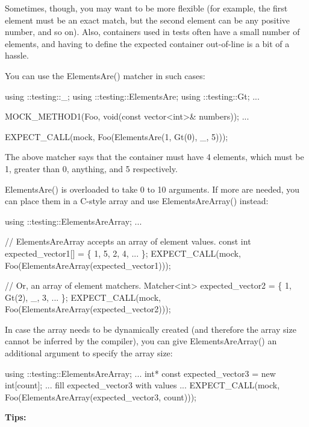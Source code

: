 Sometimes, though, you may want to be more flexible (for example, the first element must be an exact match, but the second element can be any positive number, and so on). Also, containers used in tests often have a small number of elements, and having to define the expected container out-\/of-\/line is a bit of a hassle.

You can use the {\ttfamily Elements\+Are()} matcher in such cases\+:


\begin{DoxyCode}
using ::testing::\_;
using ::testing::ElementsAre;
using ::testing::Gt;
...

  MOCK\_METHOD1(Foo, void(const vector<int>& numbers));
...

  EXPECT\_CALL(mock, Foo(ElementsAre(1, Gt(0), \_, 5)));
\end{DoxyCode}


The above matcher says that the container must have 4 elements, which must be 1, greater than 0, anything, and 5 respectively.

{\ttfamily Elements\+Are()} is overloaded to take 0 to 10 arguments. If more are needed, you can place them in a C-\/style array and use {\ttfamily Elements\+Are\+Array()} instead\+:


\begin{DoxyCode}
using ::testing::ElementsAreArray;
...

  // ElementsAreArray accepts an array of element values.
  const int expected\_vector1[] = \{ 1, 5, 2, 4, ... \};
  EXPECT\_CALL(mock, Foo(ElementsAreArray(expected\_vector1)));

  // Or, an array of element matchers.
  Matcher<int> expected\_vector2 = \{ 1, Gt(2), \_, 3, ... \};
  EXPECT\_CALL(mock, Foo(ElementsAreArray(expected\_vector2)));
\end{DoxyCode}


In case the array needs to be dynamically created (and therefore the array size cannot be inferred by the compiler), you can give {\ttfamily Elements\+Are\+Array()} an additional argument to specify the array size\+:


\begin{DoxyCode}
using ::testing::ElementsAreArray;
...
  int* const expected\_vector3 = new int[count];
  ... fill expected\_vector3 with values ...
  EXPECT\_CALL(mock, Foo(ElementsAreArray(expected\_vector3, count)));
\end{DoxyCode}


{\bfseries Tips\+:}


